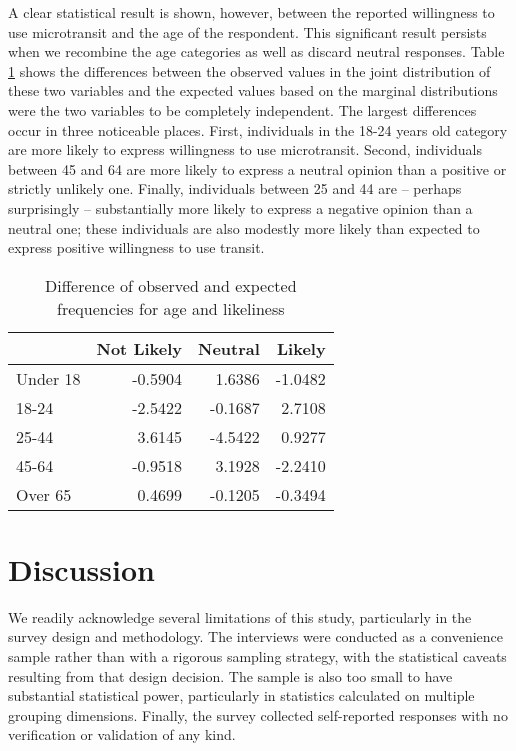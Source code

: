 \documentclass[smartcities,article,submit,moreauthors,pdftex]{Definitions/mdpi}
\begin{document}
A clear statistical result is shown, however, between the reported willingness to use microtransit and the age of the respondent. This significant result persists when we recombine the age categories as well as discard neutral responses. Table \ref{tab:age-difference} shows the differences between the observed values in the joint distribution of these two variables and the expected values based on the marginal distributions were the two variables to be completely independent. The largest differences occur in three noticeable places. First, individuals in the 18-24 years old category are more likely to express willingness to use microtransit. Second, individuals between 45 and 64 are more likely to express a neutral opinion than a positive or strictly unlikely one. Finally, individuals between 25 and 44 are -- perhaps surprisingly -- substantially more likely to express a negative opinion than a neutral one; these individuals are also modestly more likely than expected to express positive willingness to use transit.

\begin{table}[ht]
    \centering
    \caption{Difference of observed and expected frequencies for age and likeliness}
    \label{tab:age-difference}
\begin{tabular}[t]{lrrr}
\toprule
  & Not Likely & Neutral & Likely\\
\midrule
Under 18 & -0.5904 & 1.6386 & -1.0482\\
18-24 & -2.5422 & -0.1687 & 2.7108\\
25-44 & 3.6145 & -4.5422 & 0.9277\\
45-64 & -0.9518 & 3.1928 & -2.2410\\
Over 65 & 0.4699 & -0.1205 & -0.3494\\
\bottomrule
\end{tabular}
\end{table}



\section{Discussion}
We readily acknowledge several limitations of this study, particularly in the survey design and methodology. The interviews were conducted as a convenience sample rather than with a rigorous sampling strategy, with the statistical caveats resulting from that design decision. The sample is also too small to have substantial statistical power, particularly in statistics calculated on multiple grouping dimensions. Finally, the survey collected self-reported responses with no verification or validation of any kind.
\end{document}
